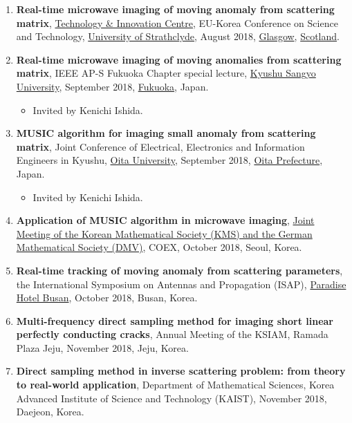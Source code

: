 \documentclass[10pt,A4]{article}
\begin{document}
\begin{enumerate}
\item\label{P-EKC2018} \textbf{Real-time microwave imaging of moving anomaly from scattering matrix}, \href{https://www.strath.ac.uk/research/technologyandinnovationcentre/}{Technology \& Innovation Centre}, EU-Korea Conference on Science and Technology, \href{https://www.strath.ac.uk}{University of Strathclyde}, August 2018, \href{https://peoplemakeglasgow.com}{Glasgow}, \href{https://www.visitscotland.com}{Scotland}.
\item\label{P-KSU2018} \textbf{Real-time microwave imaging of moving anomalies from scattering matrix}, IEEE AP-S Fukuoka Chapter special lecture, \href{https://www.kyusan-u.ac.jp/E/}{Kyushu Sangyo University}, September 2018, \href{http://www.city.fukuoka.lg.jp/index.html}{Fukuoka}, Japan.
\begin{itemize}
\item Invited by Kenichi Ishida.
\end{itemize}
\item\label{P-JCEEIE2018} \textbf{MUSIC algorithm for imaging small anomaly from scattering matrix},  Joint Conference of Electrical, Electronics and Information Engineers in Kyushu, \href{https://www.oita-u.ac.jp/lang/en/}{Oita University}, September 2018, \href{https://www.japan-guide.com/list/e1243.html}{Oita Prefecture}, Japan.
\begin{itemize}
\item Invited by Kenichi Ishida.
\end{itemize}
\item\label{P-KMS2018} \textbf{Application of MUSIC algorithm in microwave imaging}, \href{https://www.kms.or.kr/KMS-DMV/}{Joint Meeting of the Korean Mathematical Society (KMS) and the German Mathematical Society (DMV)}, COEX, October 2018, Seoul, Korea.
\item\label{P-ISAP2018} \textbf{Real-time tracking of moving anomaly from scattering parameters}, the  International Symposium on Antennas and Propagation (ISAP), \href{http://www.busanparadisehotel.co.kr}{Paradise Hotel Busan}, October 2018, Busan, Korea.
\item\label{P-KSIAM2018} \textbf{Multi-frequency direct sampling method for imaging short linear perfectly conducting cracks}, Annual Meeting of the KSIAM, Ramada Plaza Jeju, November 2018, Jeju, Korea.
\item\label{P-KAIST2018} \textbf{Direct sampling method in inverse scattering problem: from theory to real-world application}, Department of Mathematical Sciences, Korea Advanced Institute of Science and Technology (KAIST), November 2018, Daejeon, Korea.

\end{enumerate}
\end{document}
